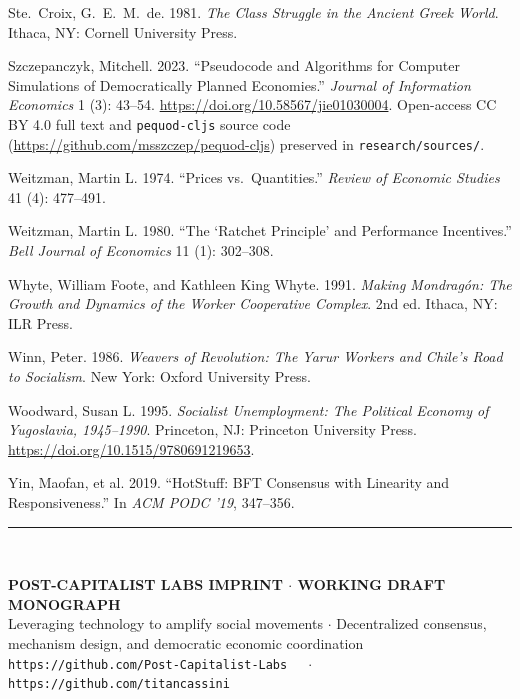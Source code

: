 \documentclass[10pt,twoside,openany]{book}
\theoremstyle{dpepstyle}
\begin{document}
\begin{list}{}{\setlength{\leftmargin}{1.8em}\setlength{\itemindent}{-1.8em}\setlength{\itemsep}{3pt}\setlength{\parsep}{0pt}}
\item Ste.~Croix, G.~E.~M.\ de. 1981. \emph{The Class Struggle in the Ancient Greek World}. Ithaca, NY: Cornell University Press.
\item Szczepanczyk, Mitchell. 2023. ``Pseudocode and Algorithms for Computer Simulations of Democratically Planned Economies.'' \emph{Journal of Information Economics} 1 (3): 43--54. \url{https://doi.org/10.58567/jie01030004}. Open-access CC BY 4.0 full text and \texttt{pequod-cljs} source code (\url{https://github.com/msszczep/pequod-cljs}) preserved in \texttt{research/sources/}.
\item Weitzman, Martin L. 1974. ``Prices vs.\ Quantities.'' \emph{Review of Economic Studies} 41 (4): 477--491.
\item Weitzman, Martin L. 1980. ``The `Ratchet Principle' and Performance Incentives.'' \emph{Bell Journal of Economics} 11 (1): 302--308.
\item Whyte, William Foote, and Kathleen King Whyte. 1991. \emph{Making Mondrag\'on: The Growth and Dynamics of the Worker Cooperative Complex}. 2nd ed. Ithaca, NY: ILR Press.
\item Winn, Peter. 1986. \emph{Weavers of Revolution: The Yarur Workers and Chile's Road to Socialism}. New York: Oxford University Press.
\item Woodward, Susan L. 1995. \emph{Socialist Unemployment: The Political Economy of Yugoslavia, 1945--1990}. Princeton, NJ: Princeton University Press. \url{https://doi.org/10.1515/9780691219653}.
\item Yin, Maofan, et al. 2019. ``HotStuff: BFT Consensus with Linearity and Responsiveness.'' In \emph{ACM PODC '19}, 347--356.
\end{list}

\vfill
\noindent\rule{\textwidth}{0.6pt}\\[0.4em]
\noindent\colorbox{NavyPrimary}{%
  \parbox{\dimexpr\textwidth-2\fboxsep\relax}{%
    \vspace{6pt}
    \centering
    {\footnotesize\bfseries\textcolor{GoldAccent}{POST-CAPITALIST LABS IMPRINT $\cdot$ WORKING DRAFT MONOGRAPH}}\\[3pt]
    {\scriptsize\color{white} Leveraging technology to amplify social movements $\cdot$ Decentralized consensus, mechanism design, and democratic economic coordination}\\[3pt]
    {\scriptsize\color{GoldAccent} \texttt{https://github.com/Post-Capitalist-Labs} $\quad\cdot\quad$ \texttt{https://github.com/titancassini}}
    \vspace{6pt}
  }%
}
\end{document}
